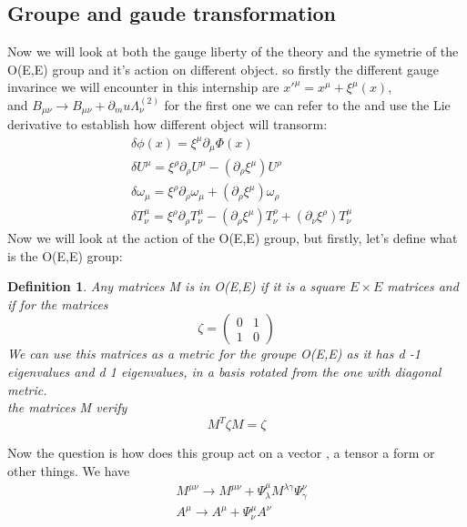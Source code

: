 \documentclass{article}
\newtheorem{definition}{Definition}
\begin{document}
\subsection{Groupe and gaude transformation} \label{gaugeandgroupe}
Now we will look at both the gauge liberty of the theory and the symetrie of the O(E,E) group and it's action on different object.
so firstly the different gauge invarince we will encounter in this internship are $x'^{\mu} = x^\mu + \xi^\mu(x)$,\\ and $B_{\mu \nu} \rightarrow B_{\mu \nu} + \partial_mu \Lambda^{(2)}_\nu$
for the first one we can refer to the \cite{freedman2012supergravity} and use the Lie derivative to establish how different object will transorm:
\begin{align} \label{xitransfo}
    &\delta \phi(x) = \xi ^ \mu \partial _ \mu \Phi (x) \\
    &\delta U ^ \mu  = \xi ^ \rho \partial _ \rho U ^ \mu - (\partial _ \rho \xi ^ \mu) U ^\rho \\
    &\delta  \omega _ \mu  = \xi ^ \rho \partial _ \rho \omega _\mu + (\partial _ \rho \xi ^ \mu) \omega _\rho \\
    &\delta T ^ \mu _ \nu  = \xi ^ \rho  \partial _ \rho T ^ \mu _ \nu -(\partial _ \rho \xi ^ \mu ) T ^ \rho _ \nu + (\partial _ \nu \xi ^ \rho)T ^ \mu _ \nu 
\end{align}
Now we will look at the action of the O(E,E) group, but firstly, let's define what is the O(E,E) group:
\begin{definition} \label{O(E,E)def}
    Any matrices M is in O(E,E) if it is a square $E\times E$ matrices and if for the matrices
    \begin{equation*}
        \zeta = \begin{pmatrix}
            0 & 1 \\ 1 & 0
        \end{pmatrix}
    \end{equation*}
    We can use this matrices as a metric for the groupe O(E,E) as it has d -1 eigenvalues and d 1 eigenvalues, in  a basis rotated from the one  with diagonal metric.\\ 
    the matrices M verify
    \begin{equation*}
        \boxed{M^T \zeta M = \zeta }
    \end{equation*}
\end{definition}
Now the question is how does this group act on a vector , a tensor a form or other things. We have
\begin{align} \label{O(E,E)action}
    &M^{\mu \nu} \rightarrow  M^{\mu \nu} + \Psi^\mu_\lambda M^{\lambda \gamma} \Psi^\nu_\gamma \\
    &A^\mu \rightarrow  A^\mu + \Psi^\mu_\nu A^\nu
\end{align}
\end{document}
